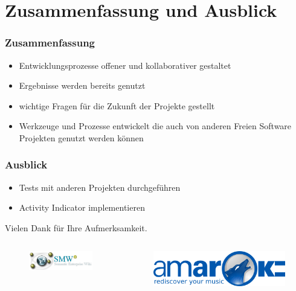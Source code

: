 \documentclass{beamer}
\begin{document}
\section{Zusammenfassung und Ausblick}

\begin{frame}
\frametitle{Zusammenfassung}
\begin{itemize}
 \item Entwicklungsprozesse offener und kollaborativer gestaltet
 \item Ergebnisse werden bereits genutzt
 \item wichtige Fragen f\"ur die Zukunft der Projekte gestellt
 \item Werkzeuge und Prozesse entwickelt die auch von anderen Freien Software Projekten genutzt werden k\"onnen
\end{itemize}
\end{frame}

\begin{frame}
\frametitle{Ausblick}
\begin{itemize}
 \item Tests mit anderen Projekten durchgeführen
 \item Activity Indicator implementieren
\end{itemize}
\end{frame}

\begin{frame}
\begin{center}
 Vielen Dank f\"ur Ihre Aufmerksamkeit.
\end{center}

\begin{columns}
   \begin{figure}[h!]
    \centering
    \includegraphics[scale=0.5,keepaspectratio=true]{./smwpluslogo.png}
   \end{figure}
   \begin{figure}[h!]
    \centering
    \includegraphics[scale=0.3,keepaspectratio=true]{./amaroklogo.png}
   \end{figure}
\end{columns}
\end{frame}
\end{document}
